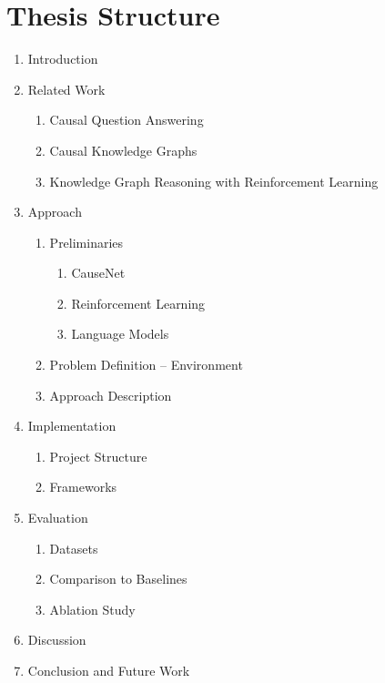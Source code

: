 %
\renewcommand{\labelenumii}{\arabic{enumi}.\arabic{enumii}}
\renewcommand{\labelenumiii}{\arabic{enumi}.\arabic{enumii}.\arabic{enumiii}}
\renewcommand{\labelenumiv}{\arabic{enumi}.\arabic{enumii}.\arabic{enumiii}.\arabic{enumiv}}

\chapter{Thesis Structure}
\label{sec:structure}

\begin{enumerate}
    \item Introduction
    \item Related Work
    \begin{enumerate}
        \item Causal Question Answering
        \item Causal Knowledge Graphs
        \item Knowledge Graph Reasoning with Reinforcement Learning
    \end{enumerate}
    \item Approach
    \begin{enumerate}
        \item Preliminaries
        \begin{enumerate}
            \item CauseNet
            \item Reinforcement Learning
            \item Language Models
        \end{enumerate}
        \item Problem Definition -- Environment
        \item Approach Description
    \end{enumerate}
    \item Implementation
    \begin{enumerate}
        \item Project Structure
        \item Frameworks
    \end{enumerate}
    \item Evaluation
    \begin{enumerate}
        \item Datasets
        \item Comparison to Baselines
        \item Ablation Study
    \end{enumerate}
    \item Discussion
    \item Conclusion and Future Work
\end{enumerate}

